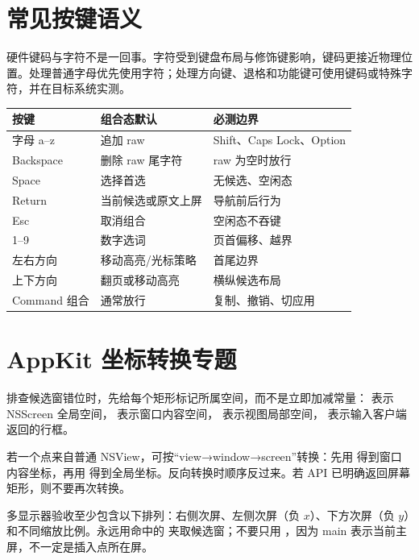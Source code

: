 \section{常见按键语义}

硬件键码与字符不是一回事。字符受到键盘布局与修饰键影响，键码更接近物理位置。处理普通字母优先使用字符；处理方向键、退格和功能键可使用键码或特殊字符，并在目标系统实测。

\begin{longtable}{p{2.3cm}p{3.7cm}p{5.2cm}}
\toprule
按键 & 组合态默认 & 必测边界 \\
\midrule
字母 a--z & 追加 raw & Shift、Caps Lock、Option \\
Backspace & 删除 raw 尾字符 & raw 为空时放行 \\
Space & 选择首选 & 无候选、空闲态 \\
Return & 当前候选或原文上屏 & 导航前后行为 \\
Esc & 取消组合 & 空闲态不吞键 \\
1--9 & 数字选词 & 页首偏移、越界 \\
左右方向 & 移动高亮/光标策略 & 首尾边界 \\
上下方向 & 翻页或移动高亮 & 横纵候选布局 \\
Command 组合 & 通常放行 & 复制、撤销、切应用 \\
\bottomrule
\end{longtable}

\section{AppKit 坐标转换专题}

排查候选窗错位时，先给每个矩形标记所属空间，而不是立即加减常量： 表示 NSScreen 全局空间， 表示窗口内容空间， 表示视图局部空间， 表示输入客户端返回的行框。


若一个点来自普通 NSView，可按“view→window→screen”转换：先用  得到窗口内容坐标，再用  得到全局坐标。反向转换时顺序反过来。若 API 已明确返回屏幕矩形，则不要再次转换。

多显示器验收至少包含以下排列：右侧次屏、左侧次屏（负 \(x\)）、下方次屏（负 \(y\)）和不同缩放比例。永远用命中的  夹取候选窗；不要只用 ，因为 main 表示当前主屏，不一定是插入点所在屏。


